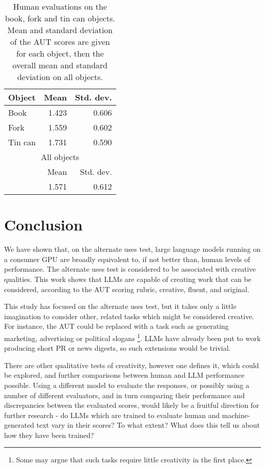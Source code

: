 \documentclass{article}
\begin{document}
\begin{table}
\centering
\begin{tabular}{lrr}
\toprule
Object & Mean & Std. dev. \\
\toprule
Book & 1.423 & 0.606 \\
Fork & 1.559 & 0.602 \\
Tin can & 1.731 & 0.590 \\
\toprule
\multicolumn{3}{c}{All objects} \\
\toprule
& Mean & Std. dev. \\
\midrule
& 1.571 & 0.612 \\
\bottomrule
\end{tabular}
\vspace{2mm}
\caption{Human evaluations on the book, fork and tin can objects. Mean and standard deviation of the AUT scores are given for each object, then the overall mean and standard deviation on all objects.}
\label{book_fork_tincan:human_results}
\end{table}

\section{Conclusion}


We have shown that, on the alternate uses test, large language models running on a consumer GPU are broadly equivalent to, if not better than, human levels of performance. The alternate uses test is considered to be associated with creative qualities. This work shows that LLMs are capable of creating work that can be considered, according to the AUT scoring rubric, creative, fluent, and original. 

This study has focused on the alternate uses test, but it takes only a little imagination to consider other, related tasks which might be considered creative. For instance, the AUT could be replaced with a task such as generating marketing, advertising or political slogans \footnote{Some may argue that such tasks require little creativity in the first place.}. LLMs have already been put to work producing short PR or news digests, so such extensions would be trivial. 

There are other qualitative tests of creativity, however one defines it, which could be explored, and further comparisons between human and LLM performance possible. Using a different model to evaluate the responses, or possibly using a number of different evaluators, and in turn comparing their performance and discrepancies between the evaluated scores, would likely be a fruitful direction for further research - do LLMs which are trained to evaluate human and machine-generated text vary in their scores? To what extent? What does this tell us about how they have been trained?
\end{document}
